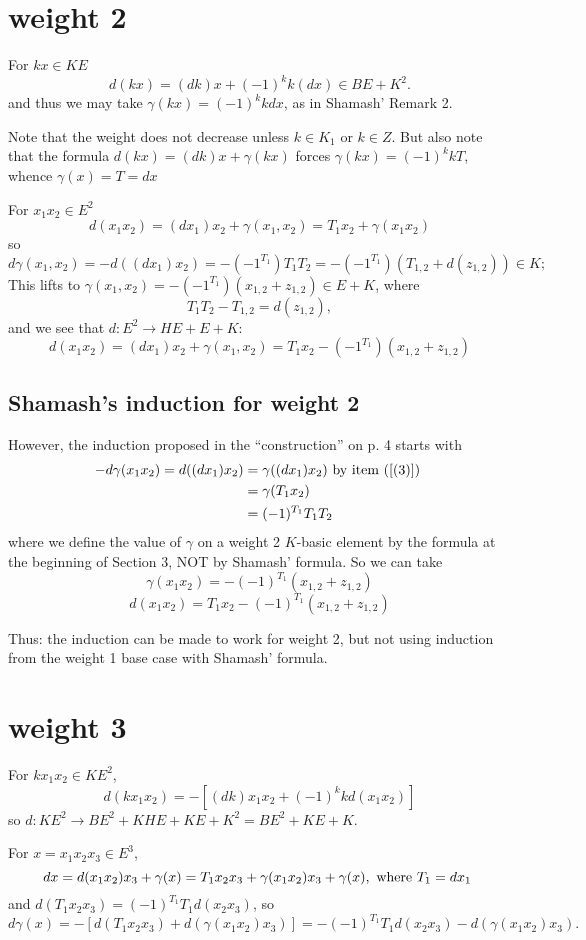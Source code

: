 \documentclass[11pt]{amsart}
\def\g{{\gamma}}
\begin{document}
\section{weight 2} 
For $kx\in KE$ 
$$
d(kx) = (dk)x+(-1)^k k(dx) \in BE+K^2.
$$
and thus we may take $\g(kx) = (-1)^{k}kdx$, as in Shamash' Remark 2.

Note that the weight does not decrease unless $k\in K_1$ or $k \in Z$. But also note that the formula
$d(kx) = (dk)x+ \g(kx)$ forces $\g(kx) = (-1)^{k}kT$, whence $\g(x) = T = dx$

For $x_1x_2\in E^2$
$$
d(x_1x_2)= (dx_1)x_2 +\g(x_1,x_2) = T_1x_2+\gamma(x_1x_2)
$$
so 
$$
d\gamma(x_1,x_2) = -d((dx_1)x_2) = -(-1^{T_1})T_1T_2 =-(-1^{T_1})(T_{1,2}+d(z_{1,2})) \in K;
$$
This lifts to $\g(x_1,x_2)=-(-1^{T_1})(x_{1,2}+z_{1,2}) \in E+K$, 
where 
$$
T_1T_2 - T_{1,2} = d(z_{1,2}),
$$
 and we see that $d:E^2\to HE+ E+K$:
 $$
d(x_1x_2)= (dx_1)x_2 +\g(x_1,x_2) = T_1x_2-(-1^{T_1})(x_{1,2}+z_{1,2})
$$


\subsection{Shamash's induction for weight 2}
However, the induction proposed in the ``construction'' on p. 4 starts with 
\begin{align*}
-d\g(x_1x_2) = d((dx_{1})x_{2})  &= \gamma((dx_{1})x_{2}) \hbox{ by item~(\ref{(3)}) }\\
&=\gamma(T_{1}x_{2})\\
&=(-1)^{T_1}T_{1}T_2
\end{align*}
where we define the value of $\g$ on a weight 2 $K$-basic element by the formula at the beginning of Section 3,
NOT by Shamash' formula.
So we can take
$$
\gamma(x_1x_2) = -(-1)^{T_1}(x_{1,2} +z_{1,2})
$$
$$
d(x_1x_2) = T_1x_2 -(-1)^{T_1}(x_{1,2} +z_{1,2})
$$

Thus: the induction can be made to work for weight 2, but not using induction from the weight 1 base case
with Shamash' formula.


\section{weight 3}
For $kx_1x_2\in KE^2$,
$$
d(kx_1x_2) = -[(dk)x_1x_2 + (-1)^k kd(x_1x_2)]
$$
so $d: KE^2 \to BE^2+KHE+KE+K^2 = BE^2+KE+K.$

For $x = x_1x_2x_3\in E^3$,
$$
dx = d(x_1x_2)x_3+\g(x) = T_1x_2x_3+\g(x_1x_2)x_3+\g(x), \hbox{ where $T_1 = dx_1$ }
$$
and $d(T_1x_2x_3) = (-1)^{T_1}T_1d(x_2x_3)$,
so
$$
d\g(x) = -[d(T_1x_2x_3)  + d(\g(x_1x_2)x_3)] = -(-1)^{T_1}T_1d(x_2x_3) - d(\g(x_1x_2)x_3).
$$
\end{document}
